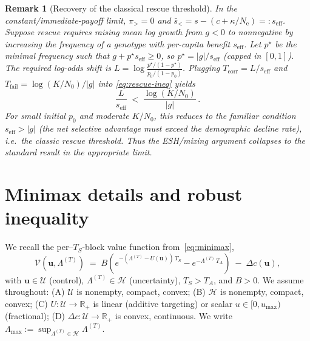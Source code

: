 \documentclass[11pt]{article}
\theoremstyle{upright}
\newtheorem{remark}{Remark}
\newcommand{\horizon}{\Lambda}
\newcommand{\Ne}{N_{\mathrm{e}}}
\newcommand{\Lmax}{\horizon^{(T)}_{\max}}
\newcommand{\Uset}{\mathcal{U}}
\newcommand{\Hset}{\mathcal{H}}
\newcommand{\hazT}[1]{\Lambda^{(#1)}}          %
\renewcommand{\Lmax}{\Lambda_{\max}}
\begin{document}
\begin{remark}[Recovery of the classical rescue threshold]
In the constant/immediate-payoff limit, $\pi_{>}=0$ and $\bar s_{<}=s-(c+\kappa/\Ne)=:s_{\mathrm{eff}}$. Suppose rescue requires raising mean log growth from $g<0$ to nonnegative by increasing the frequency of a genotype with per-capita benefit $s_{\mathrm{eff}}$. Let $p^\star$ be the minimal frequency such that $g+p^\star s_{\mathrm{eff}}\ge 0$, so $p^\star=|g|/s_{\mathrm{eff}}$ (capped in $[0,1]$).
The required log-odds shift is $L=\log\!\frac{p^\star/(1-p^\star)}{p_0/(1-p_0)}$. Plugging $T_{\mathrm{corr}}=L/s_{\mathrm{eff}}$ and $T_{\mathrm{fail}}=\log(K/N_0)/|g|$ into \eqref{eq:rescue-ineq} yields
\[
\frac{L}{s_{\mathrm{eff}}} \;<\; \frac{\log(K/N_0)}{|g|}\,.
\]
For small initial $p_0$ and moderate $K/N_0$, this reduces to the familiar condition $s_{\mathrm{eff}}>|g|$ (the net selective advantage must exceed the demographic decline rate), i.e.\ the classic rescue threshold. Thus the ESH/mixing argument collapses to the standard result in the appropriate limit.
\end{remark}

\section{Minimax details and robust inequality}
\label{sec:minimax-details}

We recall the per–$T_S$-block value function from~\eqref{eq:minimax},
\[
\mathcal V(\mathbf u,\hazT{T}) \;=\;
B\!\left(e^{-(\hazT{T}-U(\mathbf u))\,T_S}-e^{-\hazT{T}\,T_A}\right)\;-\;\Delta c(\mathbf u),
\]
with $\mathbf u\in\Uset$ (control), $\hazT{T}\in\Hset$ (uncertainty), $T_S>T_A$, and $B>0$.
We assume throughout: (A) $\Uset$ is nonempty, compact, convex; (B) $\Hset$ is nonempty, compact, convex;
(C) $U:\Uset\!\to\!\mathbb R_+$ is linear (additive targeting) or scalar $u\in[0,u_{\max})$ (fractional);
(D) $\Delta c:\Uset\!\to\!\mathbb R_+$ is convex, continuous. We write $\Lmax:=\sup_{\hazT{T}\in\Hset}\hazT{T}$.
\end{document}
